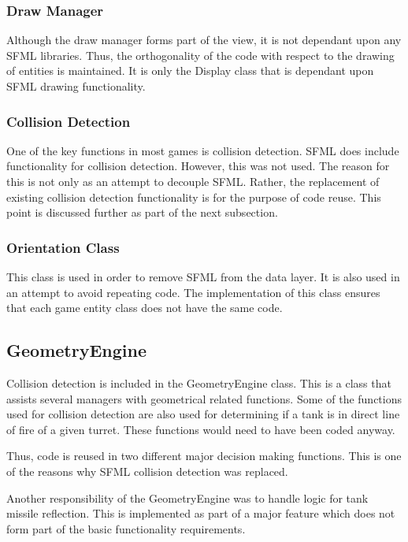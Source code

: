\documentclass[10pt,twocolumn]{witseiepaper}
\begin{document}
\subsubsection{Draw Manager} Although the draw manager forms part of the view, it is not dependant upon any SFML libraries. Thus, the orthogonality of the code with respect to the drawing of entities is maintained. It is only the Display class that is dependant upon SFML drawing functionality.

\subsubsection{Collision Detection} One of the key functions in most games is collision detection. SFML does include functionality for collision detection. However, this was not used. The reason for this is not only as an attempt to decouple SFML. Rather, the replacement of existing collision detection functionality is for the purpose of code reuse. This point is discussed further as part of the next subsection.

\subsubsection{Orientation Class}
This class is used in order to remove SFML from the data layer. It is also used in an attempt to avoid repeating code. The implementation of this class ensures that each game entity class does not have the same code.

\subsection{GeometryEngine}
Collision detection is included in the GeometryEngine class. This is a class that assists several managers with geometrical related functions. Some of the functions used for collision detection are also used for determining if a tank is in direct line of fire of a given turret. These functions would need to have been coded anyway. 

Thus, code is reused in two different major decision making functions. This is one of the reasons why SFML collision detection was replaced. 

Another responsibility of the GeometryEngine was to handle logic for tank missile reflection. This is implemented as part of a major feature which does not form part of the basic functionality requirements.

\end{document}
